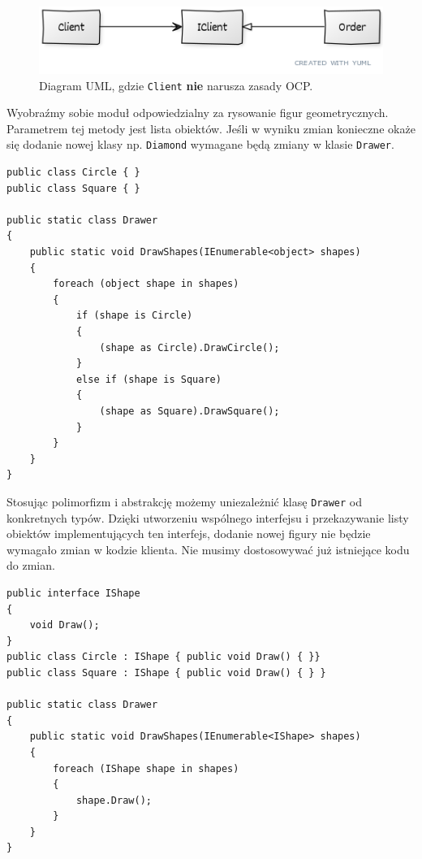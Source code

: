 \begin{figure}[hbt!]
	\centering
	\includegraphics[width=0.9\linewidth]{images/SolidOcpUml}
	\caption{Diagram UML, gdzie \texttt{Client} \textbf{nie} narusza zasady OCP.}
	\label{lab1/fig/SolidOcpUml}
\end{figure}

Wyobraźmy sobie moduł odpowiedzialny za rysowanie figur geometrycznych. Parametrem tej metody jest lista obiektów. Jeśli w wyniku zmian konieczne okaże się dodanie nowej klasy np. \texttt{Diamond} wymagane będą zmiany w klasie \texttt{Drawer}.
\begin{lstlisting}[caption={Naruszenie zasady OCP}, label={lab1/lst/ocpViolationShapes}]
public class Circle { }
public class Square { }

public static class Drawer 
{
	public static void DrawShapes(IEnumerable<object> shapes) 
	{
		foreach (object shape in shapes) 
		{
			if (shape is Circle) 
			{
				(shape as Circle).DrawCircle();
			} 
			else if (shape is Square) 
			{
				(shape as Square).DrawSquare();
			}
		}
	}
}
\end{lstlisting}

Stosując polimorfizm i abstrakcję możemy uniezależnić klasę \texttt{Drawer} od konkretnych typów. Dzięki utworzeniu wspólnego interfejsu i przekazywanie listy obiektów implementujących ten interfejs, dodanie nowej figury nie będzie wymagało zmian w kodzie klienta. Nie musimy dostosowywać już istniejące kodu do zmian.

\begin{lstlisting}[caption={Poprawne zastosowanie zasady OCP}, label={lab1/lst/ocpShapesCorrect}]
public interface IShape 
{ 
	void Draw(); 
}
public class Circle : IShape { public void Draw() { }}
public class Square : IShape { public void Draw() { } }

public static class Drawer 
{
	public static void DrawShapes(IEnumerable<IShape> shapes) 
	{
		foreach (IShape shape in shapes) 
		{
			shape.Draw();
		}
	}
}
\end{lstlisting}

